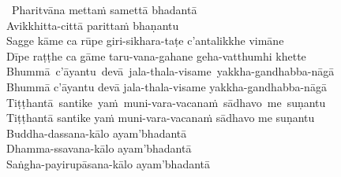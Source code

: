 \begin{leader-pharitvana}
  \anglebracketleft\ \hspace{-0.5mm}Pharitvāna\makeatletter\hyperlink{endnote124-appendix}\makeatother \thinspace
  mettaṁ samettā bhadantā\\
  Avikkhitta-cittā parittaṁ bhaṇantu\\
  Sagge kāme ca rūpe giri-sikhara-taṭe c'antalikkhe vimāne\\
  Dīpe raṭṭhe ca gāme taru-vana-gahane geha-vatthumhi khette\\
  \ifbfive\mbox{Bhummā c'āyantu devā jala-thala-visame yakkha-gandhabba-nāgā}\\\else Bhummā c'āyantu devā jala-thala-visame yakkha-gandhabba-nāgā\\\fi
  \ifbfive\mbox{Tiṭṭhantā santike yaṁ muni-vara-vacanaṁ sādhavo me suṇantu}\\\else Tiṭṭhantā santike yaṁ muni-vara-vacanaṁ sādhavo me suṇantu\\\fi
  Buddha-dassana-kālo ayam'bhadantā\\
  Dhamma-ssavana-kālo ayam'bhadantā\makeatletter\hyperlink{endnote125-appendix}\makeatother\\
  Saṅgha-payirupāsana-kālo ayam'bhadantā\ifdigital\makeatletter\hyperlink{endnote126-appendix}\makeatother\thinspace\fi \hspace{-0.5mm} \anglebracketright\
\end{leader-pharitvana}


